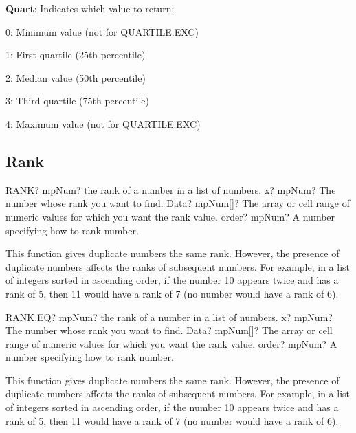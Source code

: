 \textbf{\textsf{Quart}}: Indicates which value to return:

0: Minimum value (not for \textsf{QUARTILE.EXC})

1: First quartile (25th percentile) 

2: Median value (50th percentile) 

3: Third quartile (75th percentile) 

4: Maximum value (not for \textsf{QUARTILE.EXC})





\subsection{Rank}

\begin{mpFunctionsExtract}
	\mpWorksheetFunctionThreeNotImplemented
	{RANK? mpNum? the rank of a number in a list of numbers.}
	{x? mpNum? The number whose rank you want to find.}
	{Data? mpNum[]?  The array or cell range of numeric values for which you want the rank value.}
	{order? mpNum? A number specifying how to rank number.}
\end{mpFunctionsExtract}

\vspace{0.3cm}
This function gives duplicate numbers the same rank. However, the presence of duplicate numbers affects the ranks of subsequent numbers. For example, in a list of integers sorted in ascending order, if the number 10 appears twice and has a rank of 5, then 11 would have a rank of 7 (no number would have a rank of 6).


\vspace{0.6cm}
\begin{mpFunctionsExtract}
	\mpWorksheetFunctionThreeNotImplemented
	{RANK.EQ? mpNum? the rank of a number in a list of numbers.}
	{x? mpNum? The number whose rank you want to find.}
	{Data? mpNum[]?  The array or cell range of numeric values for which you want the rank value.}
	{order? mpNum? A number specifying how to rank number.}
\end{mpFunctionsExtract}

\vspace{0.3cm}
This function gives duplicate numbers the same rank. However, the presence of duplicate numbers affects the ranks of subsequent numbers. For example, in a list of integers sorted in ascending order, if the number 10 appears twice and has a rank of 5, then 11 would have a rank of 7 (no number would have a rank of 6).


